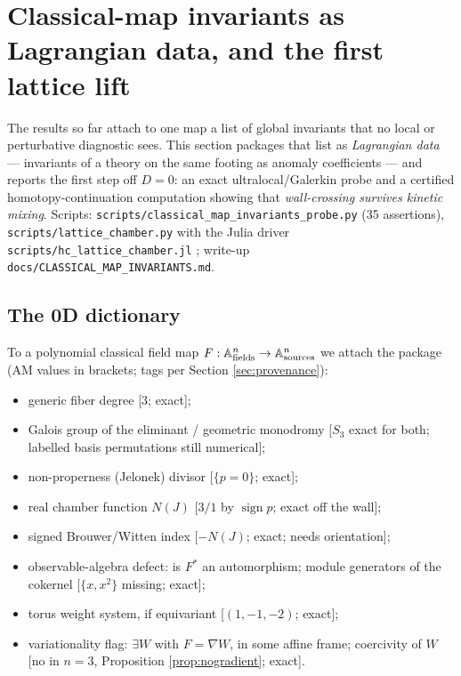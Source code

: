 \documentclass[11pt]{article}
\theoremstyle{definition}
\theoremstyle{remark}
\begin{document}
\section{Classical-map invariants as Lagrangian data, and the first
lattice lift}\label{sec:invariants}

The results so far attach to one map a list of global invariants that
no local or perturbative diagnostic sees. This section packages that
list as \emph{Lagrangian data} — invariants of a theory on the same
footing as anomaly coefficients — and reports the first step off
$D=0$: an exact ultralocal/Galerkin probe and a certified
homotopy-continuation computation showing that \emph{wall-crossing
survives kinetic mixing}. Scripts:
\texttt{scripts/classical\_map\_invariants\_probe.py} (35 assertions),
\texttt{scripts/lattice\_chamber.py} with the Julia driver
\texttt{scripts/hc\_lattice\_chamber.jl} \cite{HCjl}; write-up
\texttt{docs/CLASSICAL\_MAP\_INVARIANTS.md}.

\subsection{The 0D dictionary}\label{sec:dictionary}

To a polynomial classical field map $F:\mathbb{A}^n_{\rm fields}\to
\mathbb{A}^n_{\rm sources}$ we attach the package (AM values in
brackets; tags per Section \ref{sec:provenance}):

\begin{itemize}
\item[I1.] generic fiber degree [$3$; exact];
\item[I2.] Galois group of the eliminant / geometric monodromy
 [$S_3$ exact for both; labelled basis permutations still numerical];
\item[I3.] non-properness (Jelonek) divisor [$\{p=0\}$; exact];
\item[I4.] real chamber function $N(J)$ [$3/1$ by $\operatorname{sign}
 p$; exact off the wall];
\item[I5.] signed Brouwer/Witten index [$-N(J)$; exact; needs
 orientation];
\item[I6.] observable-algebra defect: is $F^*$ an automorphism; module
 generators of the cokernel [$\{x,x^2\}$ missing; exact];
\item[I7.] torus weight system, if equivariant [$(1,-1,-2)$; exact];
\item[I8.] variationality flag: $\exists W$ with $F=\nabla W$, in some
 affine frame; coercivity of $W$ [no in $n=3$, Proposition
 \ref{prop:nogradient}; exact].
\end{itemize}
\end{document}
